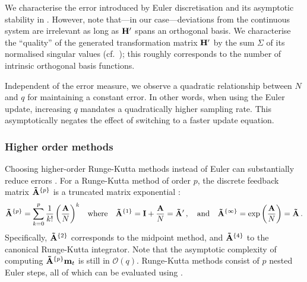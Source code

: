 We characterise the error introduced by Euler discretisation and its asymptotic stability in .
However, note that---in our case---deviations from the continuous system are irrelevant as long as $\mathbf{H}'$ spans an orthogonal basis.
We characterise the \enquote{quality} of the generated transformation matrix $\mathbf{H}'$ by the sum $\Sigma$ of its normalised singular values (cf.~); this roughly corresponds to the number of intrinsic orthogonal basis functions.

Independent of the error measure, we observe a quadratic relationship between $N$ and $q$ for maintaining a constant error.
In other words, when using the Euler update, increasing $q$ mandates a quadratically higher sampling rate.
This asymptotically negates the effect of switching to a faster update equation.

\subsubsection{Higher order methods}
Choosing higher-order Runge-Kutta methods instead of Euler can substantially reduce errors \citep[Chapter~17.1]{press2007numerical}.
For a Runge-Kutta method of order $p$, the discrete feedback matrix $\mathbf{\tilde A}^{\{p\}}$ is a truncated matrix exponential \citep[cf.][]{whitney1969more}:
\begin{align*}
	\mathbf{\tilde A}^{\{p\}} &= \sum_{k = 0}^p \frac{1}{k!} \left( \frac{\mathbf{A}}{N} \right)^k & \text{where} \quad \mathbf{\tilde A}^{\{1\}} = \mathbf{I} + \frac{\mathbf{A}}{N} = \mathbf{\tilde A}' \,, \quad \text{and} \quad \mathbf{\tilde A}^{\{\infty\}} = \exp\left(\frac{\mathbf{A}}{N}\right) = \mathbf{\tilde A} \,.
\end{align*}
Specifically, $\mathbf{\tilde A}^{\{2\}}$ corresponds to the midpoint method, and $\mathbf{\tilde A}^{\{4\}}$ to the canonical Runge-Kutta integrator.
Note that the asymptotic complexity of computing $\mathbf{\tilde A}^{\{p\}} \mathbf{m}_t$ is still in $\mathcal{O}(q)$.
Runge-Kutta methods consist of $p$ nested Euler steps, all of which can be evaluated using .

